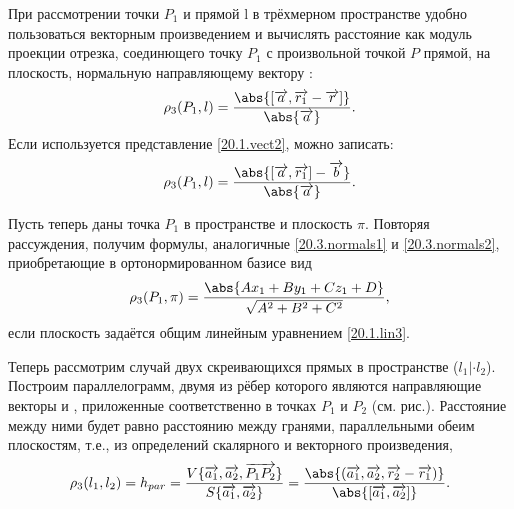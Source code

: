   При рассмотрении точки $P_1$ и прямой l в трёхмерном пространстве удобно пользоваться векторным произведением и вычислять расстояние как модуль проекции отрезка, соединющего точку $P_1$ с произвольной точкой $P$ прямой, на плоскость, нормальную направляющему вектору :
  \begin{equation}
  \rho_3 (P_1,l) = \dfrac{\abs{[\overrightarrow{a},\overrightarrow{r_1}-\overrightarrow{r}]}}{\abs{\overrightarrow{a}}}.
  \end{equation}
  Если используется представление \ref{20.1.vect2}, можно записать:
  \begin{equation}
  \rho_3 (P_1,l) = \dfrac{\abs{[\overrightarrow{a},\overrightarrow{r_1}]-\overrightarrow{b}}}{\abs{\overrightarrow{a}}}.
  \end{equation}

  Пусть теперь даны точка $P_1$ в пространстве и плоскость $\pi$. Повторяя рассуждения, получим формулы, аналогичные \ref{20.3.normals1} и \ref{20.3.normals2}, приобретающие в ортонормированном базисе вид
  \begin{equation}
  \rho_3 (P_1,\pi) = \dfrac{\abs{Ax_1+By_1+Cz_1+D}}{\sqrt{A^2+B^2+C^2}},
  \end{equation}
  если плоскость задаётся общим линейным уравнением \ref{20.1.lin3}.

  Теперь рассмотрим случай двух скреивающихся прямых в пространстве ($l_1|\cdot l_2$). Построим параллелограмм, двумя из рёбер которого являются направляющие векторы  и , приложенные соответственно в точках $P_1$ и $P_2$ (см. рис.). Расстояние между ними будет равно расстоянию между гранями, параллельными обеим плоскостям, т.е., из определений скалярного и векторного произведения,
  \begin{equation}
  \rho_3(l_1,l_2)=h_{par}=\dfrac{V \lbrace \overrightarrow{a_1},\overrightarrow{a_2},\overrightarrow{P_1P_2} \rbrace}{S \lbrace \overrightarrow{a_1},\overrightarrow{a_2} \rbrace}=\dfrac{\abs{(\overrightarrow{a_1},\overrightarrow{a_2},\overrightarrow{r_2}-\overrightarrow{r_1})}}{\abs{[\overrightarrow{a_1},\overrightarrow{a_2}]}}.
  \end{equation}   
\label{ch20pict3}